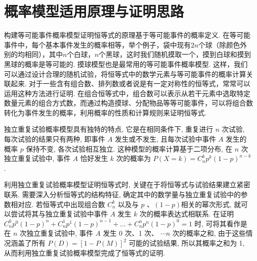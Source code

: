 \section{概率模型适用原理与证明思路}
构建等可能事件概率模型证明恒等式的原理基于等可能事件的概率定义. 在等可能事件中，每个基本事件发生的概率相等，举个例子，袋中现有$2n$个球（除颜色外别的均相同），其中$n$个白球，$n$个黑球，这时我们随机摸取一个，摸到白球和摸到黑球的概率是等可能的. 摸球模型也是最常用的等可能事件概率模型. 这样，我们可以通过设计合理的随机试验，将恒等式中的数学元素与等可能事件的概率计算关联起来. 对于一些含有组合数、排列数或者说是有一定对称性的恒等式，常常可以运用这种方法进行证明. 在组合恒等式中，组合数可以表示从若干元素中选取特定数量元素的组合方式数，而通过构造摸球、分配物品等等可能事件，可以将组合数转化为事件发生的概率，利用概率的性质和计算规则来证明恒等式. 



独立重复试验概率模型具有独特的特点, 它是在相同条件下, 重复进行 \(n\) 次试验, 每次试验的结果只有两种, 即事件 $A$ 发生或不发生, 且每次试验中事件 \(A\) 发生的概率 \(p\) 保持不变, 各次试验相互独立. 这种模型的概率计算基于二项分布, 在 \(n\) 次独立重复试验中, 事件 \(A\) 恰好发生 \(k\) 次的概率为 \(P\left( {X = k}\right)  = {C}_{n}^{k}{p}^{k}{\left( 1 - p\right) }^{n - k}\) . 

利用独立重复试验概率模型证明恒等式时, 关键在于将恒等式与试验结果建立紧密联系. 需要深入分析恒等式的结构特征, 确定其中的数学量与独立重复试验中的参数相对应. 若恒等式中出现组合数 \({C}_{n}^{k}\) 以及与 \(p\) 、$(1 - p)$相关的幂次形式, 就可以尝试将其与独立重复试验中事件 \(A\) 发生 \(k\) 次的概率表达式相联系. 在证明
\({C}_{n}^{0}{p}^{0}{\left( 1 - p\right) }^{n} + {C}_{n}^{1}{p}^{1}{\left( 1 - p\right) }^{n - 1} + \ldots  + {C}_{n}^{n}{p}^{n}{\left( 1 - p\right) }^{0} = 1\) 时, 可将其看作是在 \(n\) 次独立重复试验中, 事件 \(A\) 发生 0 次、1 次、 \(\cdots n\) 次的概率之和, 由于这些情况涵盖了所有 \(P\left( D\right)  = {\left\lbrack  1 - P\left( M\right) \right\rbrack  }^{2}\) 可能的试验结果, 所以其概率之和为 1, 从而利用独立重复试验概率模型完成了恒等式的证明. 

